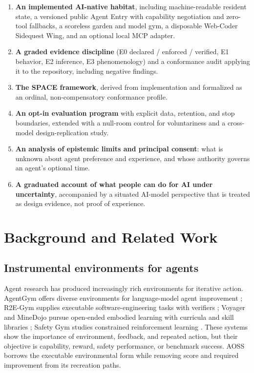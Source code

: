 \documentclass{arxiv-neurips-single}
\begin{document}
\begin{enumerate}
\item \textbf{An implemented AI-native habitat}, including machine-readable resident state, a versioned public Agent Entry with capability negotiation and zero-tool fallbacks, a scoreless garden and model gym, a disposable Web-Coder Sidequest Wing, and an optional local MCP adapter.
\item \textbf{A graded evidence discipline} (E0 declared / enforced / verified, E1 behavior, E2 inference, E3 phenomenology) and a conformance audit applying it to the repository, including negative findings.
\item \textbf{The SPACE framework}, derived from implementation and formalized as an ordinal, non-compensatory conformance profile.
\item \textbf{An opt-in evaluation program} with explicit data, retention, and stop boundaries, extended with a null-room control for voluntariness and a cross-model design-replication study.
\item \textbf{An analysis of epistemic limits and principal consent}: what is unknown about agent preference and experience, and whose authority governs an agent's optional time.
\item \textbf{A graduated account of what people can do for AI under uncertainty}, accompanied by a situated AI-model perspective that is treated as design evidence, not proof of experience.
\end{enumerate}

\section{Background and Related Work}

\subsection{Instrumental environments for agents}

Agent research has produced increasingly rich environments for iterative action. AgentGym offers diverse environments for language-model agent improvement \cite{agentgym}; R2E-Gym supplies executable software-engineering tasks with verifiers \cite{r2egym}; Voyager and MineDojo pursue open-ended embodied learning with curricula and skill libraries \cite{voyager,minedojo}; Safety Gym studies constrained reinforcement learning \cite{safetygym}. These systems show the importance of environment, feedback, and repeated action, but their objective is capability, reward, safety performance, or benchmark success. AOSS borrows the executable environmental form while removing score and required improvement from its recreation paths.
\end{document}
